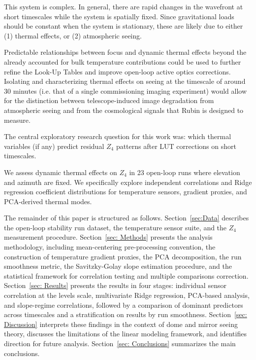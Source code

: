 \documentclass[SE,authoryear,toc]{lsstdoc}
\begin{document}
This system is complex. In general, there are rapid changes in the wavefront at short timescales while the system is spatially fixed. Since gravitational loads should be constant when the system is stationary, these are likely due to either (1) thermal effects, or (2) atmospheric seeing.

Predictable relationships between focus and dynamic thermal effects beyond the already accounted for bulk temperature contributions could be used to further refine the Look-Up Tables and improve open-loop active optics corrections. Isolating and characterizing thermal effects on seeing at the timescale of around 30 minutes (i.e. that of a single commissioning imaging experiment) would allow for the distinction between telescope-induced image degradation from atmospheric seeing and from the cosmological signals that Rubin is designed to measure.

The central exploratory research question for this work was: which thermal variables (if any) predict residual $Z_4$ patterns after LUT corrections on short timescales.

We assess dynamic thermal effects on $Z_4$ in 23 open-loop runs where elevation and azimuth are fixed. We specifically explore independent correlations and Ridge regression coefficient distributions for temperature sensors, gradient proxies, and PCA-derived thermal modes. 

The remainder of this paper is structured as follows. Section~\ref{sec:Data} describes the open-loop stability run dataset, the temperature sensor suite, and the $Z_4$ measurement procedure. Section~\ref{sec: Methods} presents the analysis methodology, including mean-centering pre-processing convention, the construction of temperature gradient proxies, the PCA decomposition, the run smoothness metric, the Savitzky-Golay slope estimation procedure, and the statistical framework for correlation testing and multiple comparisons correction. Section~\ref{sec: Results} presents the results in four stages: individual sensor correlation at the levels scale, multivariate Ridge regression, PCA-based analysis, and slope-regime correlations, followed by a comparison of dominant predictors across timescales and a stratification on results by run smoothness. Section~\ref{sec: Discussion} interprets these findings in the context of dome and mirror seeing theory, discusses the limitations of the linear modeling framework, and identifies direction for future analysis. Section~\ref{sec: Conclusions} summarizes the main conclusions.
\end{document}
